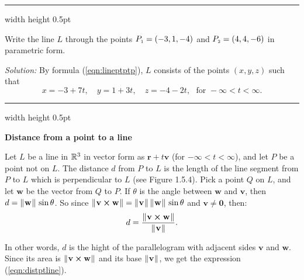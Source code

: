 \medskip
\hrule width \textwidth height 0.5pt
\begin{exmp}\label{exmp:linethrupts}
 Write the line $L$ through the points $P_{\scriptscriptstyle 1} = (-3,1,-4)$ and $P_{\scriptscriptstyle 2} = (4,4,-6)$ in parametric
 form.\smallskip
 \par\noindent\emph{Solution:} By formula (\ref{eqn:lineptptp}), $L$ consists of the points $(x,y,z)$ such that
 \begin{displaymath}
  x = -3 + 7t, \quad y = 1 +3t, \quad z = -4 -2t, \text{~~for~} -\infty < t < \infty.
 \end{displaymath}
\end{exmp}
\hrule width \textwidth height 0.5pt
\medskip

\par\noindent\textbf{\large{Distance from a point to a line}}
\normalsize
\smallskip


\piccaption[]{}
Let $L$ be a line in $\mathbb{R}^{3}$ in vector form as $\mathbf{r} + t \mathbf{v}$ (for $-\infty < t < \infty$), and
let $P$ be a point not on $L$. 
The distance $d$ from $P$ to $L$ is the length
of the line segment from $P$ to $L$ which is perpendicular to $L$ (see Figure 1.5.4).
Pick a point $Q$ on $L$, and let $\mathbf{w}$ be the vector from $Q$ to $P$. 
If $\theta$ is the angle between $\mathbf{w}$
and $\mathbf{v}$, then $d = \lVert\mspace{1mu}\mathbf{w}\mspace{1mu}\rVert\,\sin \theta$. So since
$\lVert\mspace{1mu}\mathbf{v} \bm{\times} \mathbf{w}\mspace{1mu}\rVert = \lVert\mspace{1mu}\mathbf{v}\mspace{1mu}\rVert\,\lVert\mspace{1mu}\mathbf{w}\mspace{1mu}\rVert\,\sin \theta$ and
$\mathbf{v} \ne \mathbf{0}$, then:
\begin{equation}\label{eqn:distptline}
 d = \frac{\lVert\mspace{1mu}\mathbf{v} \bm{\times} \mathbf{w}\mspace{1mu}\rVert}{\lVert\mspace{1mu}\mathbf{v}\mspace{1mu}\rVert}.
\end{equation}

In other words, $d$ is the hight of the parallelogram with adjacent sides $\mathbf{v}$ and $\mathbf{w}$.
Since its area is $\lVert\mspace{1mu}\mathbf{v} \bm{\times} \mathbf{w}\mspace{1mu}\rVert$ 
and its base $\lVert\mspace{1mu}\mathbf{v}\mspace{1mu}\rVert$, we get the expression (\ref{eqn:distptline}).

